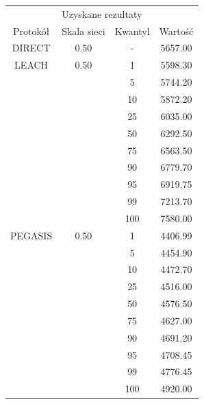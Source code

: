 \documentclass[a4paper,12pt,twoside,openany]{report}
\begin{document}
\begin{longtable}{*{4}{c}}
\toprule
\multicolumn{4}{c}{Uzyskane rezultaty} \\
Protokół	& Skala sieci	& Kwantyl	& Wartość \\
\midrule
\endhead
DIRECT	& 0.50 	& -	& 5657.00 \\*
\midrule
LEACH	& 0.50	& 1	& 5598.30 \\*
	&	& 5	& 5744.20 \\*
	&	& 10	& 5872.20 \\*
	&	& 25	& 6035.00 \\*
	&	& 50	& 6292.50 \\*
	&	& 75	& 6563.50 \\*
	&	& 90	& 6779.70 \\*
	&	& 95	& 6919.75 \\*
	&	& 99	& 7213.70 \\*
	&	& 100	& 7580.00 \\*
\midrule
PEGASIS	& 0.50	& 1	& 4406.99 \\*
	&	& 5	& 4454.90 \\*
	&	& 10	& 4472.70 \\*
	&	& 25	& 4516.00 \\*
	&	& 50	& 4576.50 \\*
	&	& 75	& 4627.00 \\*
	&	& 90	& 4691.20 \\*
	&	& 95	& 4708.45 \\*
	&	& 99	& 4776.45 \\*
	&	& 100	& 4920.00 \\*
\bottomrule
\end{longtable}
\end{document}
